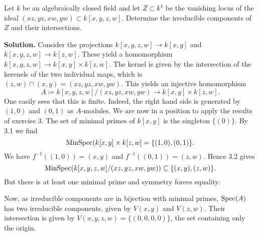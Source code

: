 \documentclass[a4paper,11pt]{article}
\begin{document}
Let $k$ be an algebraically closed field and let $Z \subset k^4$ be
the vanishing locus of the ideal
$(xz,yz,xw,yw) \subset k[x,y,z,w]$. Determine the irreducible components
of $Z$ and their intersections. 

\textbf{Solution.} Consider the projections $k[x,y,z,w] \to k[x,y]$ 
and $k[x,y,z,w] \to k[z,w]$. These yield a homomorphism $k[x,y,z,w] \to
k[x,y] \times k[z,w]$. The kernel is given by the intersection of the kerenels
of the two individual maps, which is $(z,w) \cap (x,y) = (xz,yz, xw, yw)$. 
This yields an injective homomorphism
$$A \coloneqq k[x,y,z,w]/(xz,yz,xw,yw) \to k[x,y] \times k[z,w].$$
One easily sees that this is finite. Indeed, the right hand side is generated
by $(1,0)$ and $(0,1)$ as $A$-modules. 
We are now in a position to apply the results of exercise 3. The set of minimal
primes of $k[x,y]$ is the singleton $\{(0)\}$. By 3.1 we find
\begin{equation*}
    \operatorname{MinSpec}(k[x,y] \times k[z,w] = \{(1,0), (0,1)\}.
\end{equation*}
We have $f^{-1}((1,0)) = (x,y)$ and $f^{-1}((0,1)) = (z,w)$. Hence 3.2 gives
\begin{equation*}
    \operatorname{MinSpec}(k[x,y,z,w]/(xz,yz,xw,yw)) \subseteq \{(x,y), (z,w)\}.
\end{equation*}
But there is at least one minimal prime and symmetry forces equality.

Now, as irreducible components are in bijection with minimal primes,
$\operatorname{Spec}(A)$ has two irreducible components, given by
$V(x,y)$ and $V(z,w)$. Their intersection is given by 
$V(x,y,z,w) = \{(0,0,0,0)\}$, the set containing only the origin.



\contactend
\end{document}

